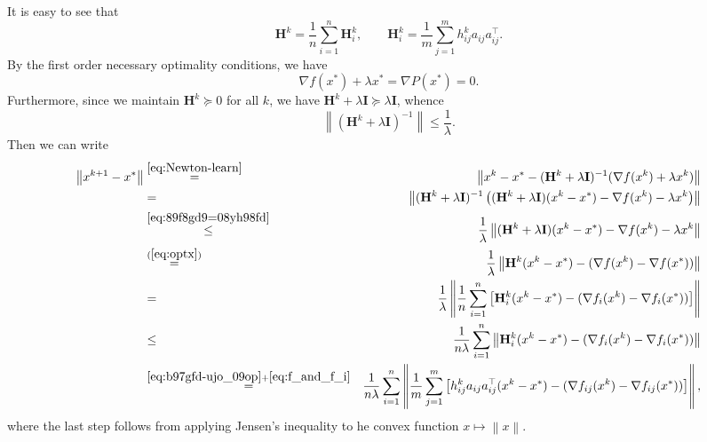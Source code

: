 \documentclass[12pt]{article}
\newcommand{\norm}[1]{\left\|#1\right\|}
\newcommand{\mH}{\mathbf{H}}
\newcommand{\mI}{\mathbf{I}}
\begin{document}
It is easy to see that \begin{equation}\label{eq:b97gfd-ujo_09op}\mH^k = \frac{1}{n} \sum_{i=1}^n \mH^k_i, \qquad \mH^k_i = \frac{1}{m} \sum_{j=1}^{m} h^k_{ij} a_{ij}a_{ij}^\top .\end{equation}
By the first order necessary optimality conditions, we have
\begin{equation}\label{eq:optx}
\nabla f(x^*) + \lambda x^*  = \nabla P(x^*)= 0. 
\end{equation}
Furthermore, since we maintain $\mH^k \succeq 0$ for all $k$, we have $\mH^k + \lambda \mI \succeq \lambda \mI$, whence  \begin{equation}\label{eq:89f8gd9=08yh98fd}\norm{\left(\mH^k + \lambda \mI \right)^{-1}} \leq \frac{1}{\lambda}.\end{equation}
Then we can write
\begin{eqnarray}
	\norm{ x^{k+1} - x^* } &\overset{\eqref{eq:Newton-learn}}{=}& \norm{ x^k - x^* - (\mH^k + \lambda \mI)^{-1} (\nabla f(x^k) + \lambda x^k) }\notag  \\
	&=& \norm{ (\mH^k + \lambda \mI)^{-1} \left(  (\mH^k + \lambda \mI)(x^k - x^*) - \nabla f(x^k) - \lambda x^k  \right) } \notag \\ 
	&\overset{\eqref{eq:89f8gd9=08yh98fd}}{\leq}& \frac{1}{\lambda} \norm{  (\mH^k + \lambda \mI)(x^k - x^*) - \nabla f(x^k) - \lambda x^k  } \notag \\ 
	&\overset{(\ref{eq:optx})}{=}& \frac{1}{\lambda} \norm{ \mH^k (x^k - x^*) - (\nabla f(x^k) - \nabla f(x^*)) } \notag \\ 
	&=& \frac{1}{\lambda} \norm{ \frac{1}{n} \sum_{i=1}^n \left[\mH_i^k (x^k - x^*) - (\nabla f_i(x^k) - \nabla f_i(x^*)) \right]}\notag  \\ 
	&\leq& \frac{1}{n \lambda} \sum_{i=1}^n \norm{ \mH_i^k (x^k - x^*) - (\nabla f_i(x^k) - \nabla f_i(x^*)) } \notag  \\
	&\overset{\eqref{eq:b97gfd-ujo_09op}+\eqref{eq:f_and_f_i} }{=}& \frac{1}{n \lambda} \sum_{i=1}^n \norm{ \frac{1}{m} \sum_{j=1}^m  \left[ h_{ij}^k a_{ij} a_{ij}^\top (x^k - x^*) - (\nabla f_{ij}(x^k) - \nabla f_{ij}(x^*)) \right] },\label{eq:pop_us_lop_989f}
	\end{eqnarray}
	where the last step follows from applying Jensen's inequality to he convex function $x\mapsto \norm{x}$. 
\end{document}
